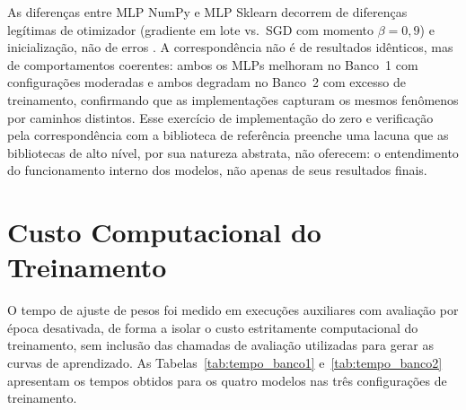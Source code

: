 As diferen\c cas entre MLP NumPy e MLP Sklearn decorrem de diferen\c cas leg\'itimas de otimizador (gradiente em lote vs.\ SGD com momento $\beta = 0{,}9$) e inicializa\c c\~ao, n\~ao de erros \cite{pedregosa2011}. A correspond\^encia n\~ao \'e de resultados id\^enticos, mas de comportamentos coerentes: ambos os MLPs melhoram no Banco~1 com configura\c c\~oes moderadas e ambos degradam no Banco~2 com excesso de treinamento, confirmando que as implementa\c c\~oes capturam os mesmos fen\^omenos por caminhos distintos. Esse exerc\'icio de implementa\c c\~ao do zero e verifica\c c\~ao pela correspond\^encia com a biblioteca de refer\^encia preenche uma lacuna que as bibliotecas de alto n\'ivel, por sua natureza abstrata, n\~ao oferecem: o entendimento do funcionamento interno dos modelos, n\~ao apenas de seus resultados finais.

\section{Custo Computacional do Treinamento}
\label{sec:custo_computacional}

O tempo de ajuste de pesos foi medido em execu\c c\~oes auxiliares com avalia\c c\~ao por
\'epoca desativada, de forma a isolar o custo estritamente computacional do treinamento,
sem inclus\~ao das chamadas de avalia\c c\~ao utilizadas para gerar as curvas de aprendizado.
As Tabelas~\ref{tab:tempo_banco1} e~\ref{tab:tempo_banco2} apresentam os tempos obtidos
para os quatro modelos nas tr\^es configura\c c\~oes de treinamento.

\begin{table}[H]
\centering
\caption{Tempo de ajuste de pesos (segundos), Banco 1 (513 amostras de treino).}
\label{tab:tempo_banco1}
\end{table}


